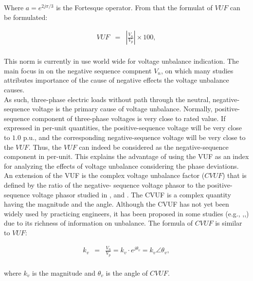	Where $a=e^{2j\pi/3}$ is the Fortesque operator. From that the formulat of $VUF$ can be formulated:
	
	
	\begin{equation}
        \begin{array}{rcl}
            VUF&=&\left|\frac{V_n}{V_p}\right|\times100,\\					
        \end{array}
        \label{BASICUNB:equ:VUF}
    \end{equation}
	
This norm is currently in use world wide for voltage unbalance indication. The main focus in on the negative sequence compnent $V_n$, on which many studies attributes importance of the cause of negative effects the voltage unbalance causes.\\
	As such, three-phase electric loads without path through the neutral, negative-sequence voltage is the primary cause of voltage unbalance. Normally, positive-sequence component of three-phase voltages is very close to rated value. If expressed in per-unit quantities, the positive-sequence voltage will be very close to $1.0$ p.u., and the corresponding negative-sequence voltage will be very close to the $VUF$. Thus, the $VUF$ can indeed be considered as the negative-sequence component in per-unit.	This explains the advantage of using the VUF as an index for analyzing the effects of voltage unbalance considering the phase deviations.
	An extension of the VUF is the complex voltage unbalance factor ($CVUF$) that is defined by the ratio of the negative-
sequence voltage phasor to the positive-sequence voltage phasor studied in \cite{wang2000analytical}, and \cite{pierrat1987unbalance}. The CVUF is a complex quantity having the magnitude and the angle. Although the CVUF has not yet been widely used by practicing engineers, it has been proposed in some studies (e.g., \cite{wang2001analysis},\cite{singh2007some},\cite{chen2013examination}) due to its richness of information on unbalance. The formula of $CVUF$ is similar to $VUF$:

\begin{equation}
        \begin{array}{rcl}
            k_v&=&\frac{V_n}{V_p}=k_v\cdot e^{j\theta_v}=k_v\angle\theta_v,\\					
        \end{array}
        \label{BASICUNB:equ:CVUF}
    \end{equation}
		
		where $k_v$ is the magnitude and $\theta_v$ is the angle of $CVUF$.
		
